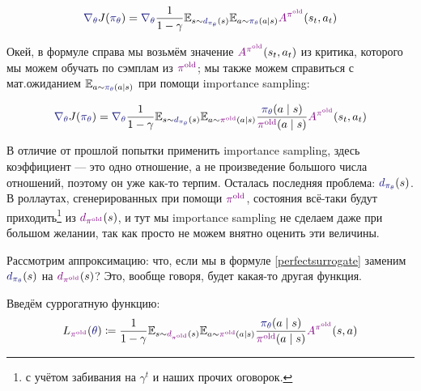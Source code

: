 \begin{proposition}
$$\textcolor{ChadBlue}{\nabla_\theta} J(\textcolor{ChadBlue}{\pi_{\theta}}) = \textcolor{ChadBlue}{\nabla_\theta} \frac{1}{1 - \gamma}\E_{s \sim \textcolor{ChadBlue}{d_{\pi_{\theta}}}(s)} \E_{a \sim \textcolor{ChadBlue}{\pi_{\theta}}(a \mid s)} \textcolor{ChadPurple}{A^{\pi^{\old}}}(s_t, a_t)$$
\end{proposition}

Окей, в формуле справа мы возьмём значение $\textcolor{ChadPurple}{A^{\pi^{\old}}}(s_t, a_t)$ из критика, которого мы можем обучать по сэмплам из $\textcolor{ChadPurple}{\pi^{\old}}$; мы также можем справиться с мат.ожиданием $\E_{a \sim \textcolor{ChadBlue}{\pi_{\theta}}(a \mid s)}$ при помощи importance sampling:

\begin{proposition}
\begin{equation}\label{perfectsurrogate}
\textcolor{ChadBlue}{\nabla_\theta} J(\textcolor{ChadBlue}{\pi_{\theta}}) = \textcolor{ChadBlue}{\nabla_\theta} \frac{1}{1 - \gamma} \E_{s \sim \textcolor{ChadBlue}{d_{\pi_{\theta}}}(s)} \E_{a \sim \textcolor{ChadPurple}{\pi^{\old}}(a \mid s)} \frac{\textcolor{ChadBlue}{\pi_{\theta}}(a \mid s)}{\textcolor{ChadPurple}{\pi^{\old}}(a \mid s)} \textcolor{ChadPurple}{A^{\pi^{\old}}}(s_t, a_t)
\end{equation}
\end{proposition}

В отличие от прошлой попытки применить importance sampling, здесь коэффициент --- это одно отношение, а не произведение большого числа отношений, поэтому он уже как-то терпим. Осталась последняя проблема: $\textcolor{ChadBlue}{d_{\pi_{\theta}}}(s)$. В роллаутах, сгенерированных при помощи $\textcolor{ChadPurple}{\pi^{\old}}$, состояния всё-таки будут приходить\footnote{с учётом забивания на $\gamma^t$ и наших прочих оговорок.} из $\textcolor{ChadPurple}{d_{\pi^{\old}}}(s)$, и тут мы importance sampling не сделаем даже при большом желании, так как просто не можем внятно оценить эти величины.

Рассмотрим аппроксимацию: что, если мы в формуле \eqref{perfectsurrogate} заменим $\textcolor{ChadBlue}{d_{\pi_{\theta}}}(s)$ на $\textcolor{ChadPurple}{d_{\pi^{\old}}}(s)$? Это, вообще говоря, будет какая-то другая функция.

\begin{definition}
Введём суррогатную функцию:
\begin{equation}\label{surrogate}
L_{\textcolor{ChadPurple}{\pi^{\old}}}(\textcolor{ChadBlue}{\theta}) \coloneqq \frac{1}{1 - \gamma}\E_{s \sim \textcolor{ChadPurple}{d_{\pi^{\old}}}(s)} \E_{a \sim \textcolor{ChadPurple}{\pi^{\old}}(a \mid s)} \frac{\textcolor{ChadBlue}{\pi_\theta}(a \mid s)}{\textcolor{ChadPurple}{\pi^{\old}}(a \mid s)} \textcolor{ChadPurple}{A^{\pi^{\old}}}(s, a)   
\end{equation}
\end{definition}

